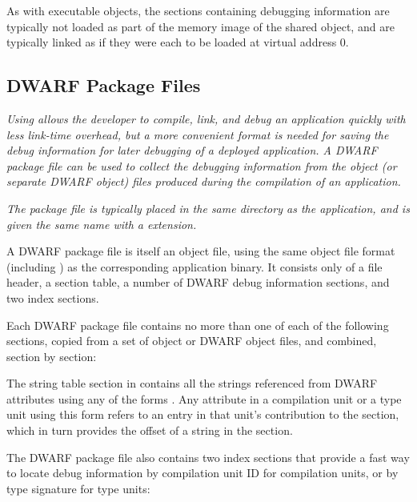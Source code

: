 As with executable objects, the sections containing debugging
information are typically not loaded as part of the memory image
of the shared object, and are typically linked as if they were
each to be loaded at virtual address 0.

\subsection{DWARF Package Files}
\label{datarep:dwarfpackagefiles}
\textit{Using  allows the developer to compile, 
link, and debug an application quickly with less link-time overhead,
but a more convenient format is needed for saving the debug
information for later debugging of a deployed application. A
DWARF package file can be used to collect the debugging
information from the object (or separate DWARF object) files
produced during the compilation of an application.}

\textit{The package file is typically placed in the same directory as the
application, and is given the same name with a 
extension.}

A DWARF package file is itself an object file, using the
same object file format (including \byteorder) as the
corresponding application binary. It consists only of a file
header, a section table, a number of DWARF debug information
sections, and two index sections.

Each DWARF package file contains no more than one of each of the
following sections, copied from a set of object or DWARF object
files, and combined, section by section:
\begin{alltt}
    \dotdebuginfodwo
    \dotdebugabbrevdwo
    \dotdebuglinedwo
    \dotdebugloclistsdwo
    \dotdebugrnglistsdwo
    \dotdebugstroffsetsdwo
    \dotdebugstrdwo
    \dotdebugmacrodwo
\end{alltt}

The string table section in \dotdebugstrdwo{} contains all the
strings referenced from DWARF attributes using 
any of the forms
\DWFORMstrxXNor. Any attribute in a compilation unit or a type
unit using this form refers to an entry in that unit's
contribution to the \dotdebugstroffsetsdwo{} section, which in turn
provides the offset of a string in the \dotdebugstrdwo{}
section.

The DWARF package file also contains two index sections that
provide a fast way to locate debug information by compilation
unit ID for compilation units, or by type
signature for type units:
\begin{alltt}
    \dotdebugcuindex
    \dotdebugtuindex
\end{alltt}

